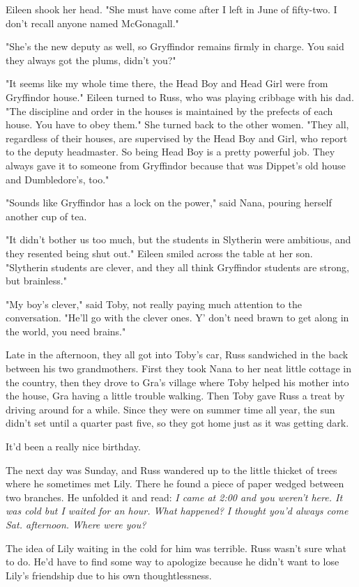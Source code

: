Eileen shook her head. "She must have come after I left in June of fifty-two. I don't recall anyone named McGonagall."

"She's the new deputy as well, so Gryffindor remains firmly in charge. You said they always got the plums, didn't you?"

"It seems like my whole time there, the Head Boy and Head Girl were from Gryffindor house." Eileen turned to Russ, who was playing cribbage with his dad. "The discipline and order in the houses is maintained by the prefects of each house. You have to obey them." She turned back to the other women. "They all, regardless of their houses, are supervised by the Head Boy and Girl, who report to the deputy headmaster. So being Head Boy is a pretty powerful job. They always gave it to someone from Gryffindor because that was Dippet's old house and Dumbledore's, too."

"Sounds like Gryffindor has a lock on the power," said Nana, pouring herself another cup of tea.

"It didn't bother us too much, but the students in Slytherin were ambitious, and they resented being shut out." Eileen smiled across the table at her son. "Slytherin students are clever, and they all think Gryffindor students are strong, but brainless."

"My boy's clever," said Toby, not really paying much attention to the conversation. "He'll go with the clever ones. Y' don't need brawn to get along in the world, you need brains."

Late in the afternoon, they all got into Toby's car, Russ sandwiched in the back between his two grandmothers. First they took Nana to her neat little cottage in the country, then they drove to Gra's village where Toby helped his mother into the house, Gra having a little trouble walking. Then Toby gave Russ a treat by driving around for a while. Since they were on summer time all year, the sun didn't set until a quarter past five, so they got home just as it was getting dark.

It'd been a really nice birthday.

The next day was Sunday, and Russ wandered up to the little thicket of trees where he sometimes met Lily. There he found a piece of paper wedged between two branches. He unfolded it and read: \emph{I came at 2:00 and you weren't here. It was cold but I waited for an hour. What happened? I thought you'd always come Sat. afternoon. Where were you?}

The idea of Lily waiting in the cold for him was terrible. Russ wasn't sure what to do. He'd have to find some way to apologize because he didn't want to lose Lily's friendship due to his own thoughtlessness.

